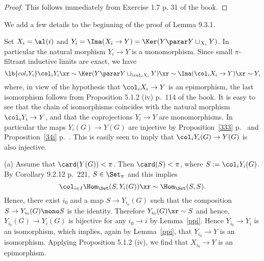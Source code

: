 \documentclass[12pt]{article}
\theoremstyle{remark}
\theoremstyle{definition}
\begin{document}
\begin{proof}
This follows immediately from Exercise 1.7 p. 31 of the book.
\end{proof}





We add a few details to the beginning of the proof of Lemma 9.3.1. 

Set $X_i=\al(i)$ and $Y_i=\Ima(X_i\to Y)=\Ker(Y\parar Y\sqcup_{X_i}Y)$. In particular the natural morphism $Y_i\to Y$ is a monomorphism. Since small $\pi$-filtrant inductive limits are exact, we have
\begin{equation}\lb{col_iY_i}
\col_iY_i\xr\sim\Ker(Y\parar Y\sqcup_{\col_iX_i}Y)\xr\sim\Ima(\col_iX_i\to Y)\xr\sim Y,
\end{equation} 
where, in view of the hypothesis that $\col_iX_i\to Y$ is an epimorphism, the last isomorphism %
follows from Proposition 5.1.2 (iv) p.~114 of the book. It is easy to see that the chain of isomorphisms  coincides with the natural morphism $\col_iY_i\to Y$, and that the coprojections $Y_i\to Y$ are monomorphisms. In particular the maps $Y_i(G)\to Y(G)$ are injective by Proposition~\ref{333} p.~ and Proposition~\ref{34i} p.~. This is easily seen to imply that $\col_iY_i(G)\to Y(G)$ is also injective. 

\nn(a) Assume that $\card(Y(G))<\pi$. Then $\card(S)<\pi$, where $S:=\col_iY_i(G)$. By Corollary 9.2.12 p.~221, $S\in\Set_\pi$ and this implies 
$$
\col_{i\in I}\Hom_\Set(S,Y_i(G))\xr\sim\Hom_\Set(S,S).
$$ 
Hence, there exist $i_0$ and a map $S\to Y_{i_0}(G)$ such that the composition $S\to Y_{i_0}(G)\mono S$ is the identity. Therefore $Y_{i_0}(G)\xr\sim S$ and hence, $Y_{i_0}(G)\to Y_i (G)$ is bijective for any $i_0\to i$ by Lemma~\ref{ppi}. Hence $Y_{i_0}\to Y_i$ is an isomorphism, which implies, again by Lemma~\ref{ppi}, that $Y_{i_0}\to Y$ is an isomorphism. Applying Proposition 5.1.2 (iv), we find that $X_{i_0}\to Y$ is an epimorphism.%
\end{document}
